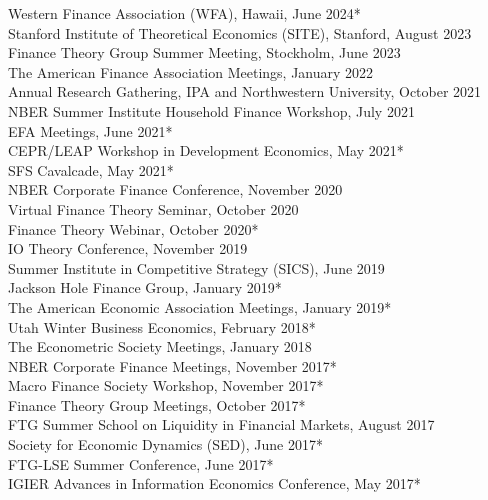 \documentclass[margin,line,11pt]{resume}
\begin{document}
\begin{resume}
Western Finance Association (WFA), Hawaii, June 2024* \\ %
Stanford Institute of Theoretical Economics (SITE), Stanford, August 2023 \\ %
Finance Theory Group Summer Meeting, Stockholm, June 2023 \\ %
The American Finance Association Meetings, January 2022 \\ %
Annual Research Gathering, IPA and Northwestern University, October 2021 \\ %
NBER Summer Institute Household Finance Workshop, July 2021 \\ %
EFA Meetings, June 2021* \\%
CEPR/LEAP Workshop in Development Economics, May 2021* \\%
SFS Cavalcade, May 2021* \\%
NBER Corporate Finance Conference, November 2020 \\%
Virtual Finance Theory Seminar, October 2020 \\%
Finance Theory Webinar, October 2020* \\ %
IO Theory Conference, November 2019 \\ %
Summer Institute in Competitive Strategy (SICS), June 2019 \\ %
Jackson Hole Finance Group, January 2019* \\
The American Economic Association Meetings, January 2019* \\%
Utah Winter Business Economics, February 2018* \\ %
The Econometric Society Meetings, January 2018  \\ %
NBER Corporate Finance Meetings, November 2017* \\ %
Macro Finance Society Workshop, November 2017* \\%
Finance Theory Group Meetings, October 2017* \\%
FTG Summer School on Liquidity in Financial Markets, August 2017 \\ %
Society for Economic Dynamics (SED), June 2017* \\ %
FTG-LSE Summer Conference, June 2017* \\ %
IGIER Advances in Information Economics Conference, May 2017* \\ %

\end{resume}
\end{document}
